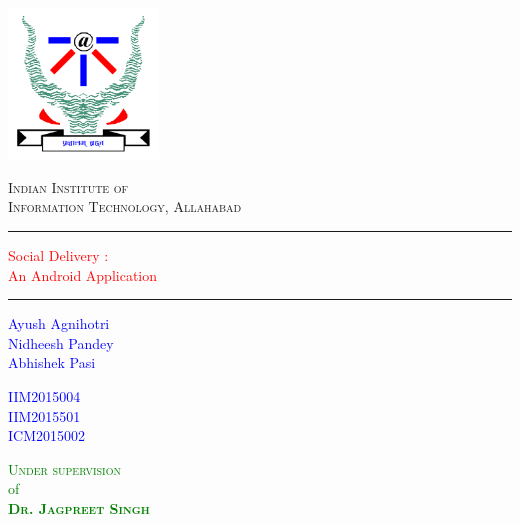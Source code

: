 \documentclass{report}
\begin{document}
 

\begin{titlepage}
	\centering
	\includegraphics[width=4cm]{logo.png}\\[.5cm]
	{\scshape\LARGE Indian Institute of \\Information Technology, Allahabad \par}
	\vspace{1cm}
	\rule{\textwidth}{2pt}	
	\vspace{0.15\textheight}
		
	\textcolor{Red}{ 
		{\fontsize{35}{52}\selectfont Social Delivery : \\[8pt] An Android Application}\\[0.5\baselineskip]
	}
	
	\vspace{0.15\textheight} 
	\setlength\columnsep{0pt}
	\rule{0.3\textwidth}{0.4pt} 
	\begin{multicols}{3} 
	\textcolor{Blue}{
		\begin{flushleft} 
		{\large \quad \quad \quad \quad Ayush Agnihotri}\\[8pt] 
		{\large \quad \quad \quad \quad Nidheesh Pandey}\\[8pt]
		{\large \quad \quad \quad \quad Abhishek Pasi}\\[8pt]
		\end{flushleft}
		}
		\columnbreak
		 
	\textcolor{Blue}{
		\begin{flushleft} 
		{\large IIM2015004}\\[8pt] 
		{\large IIM2015501}\\[8pt]
		{\large ICM2015002}\\[8pt]
		\end{flushleft}
		}
		\columnbreak

	\textcolor{Green}{
		\begin{flushright}
		{\Large \textsc{Under supervision}}\\[8pt]
		{\large of}\\[8pt]
		{\Large \textsc{\textbf{Dr. Jagpreet Singh}}}\\[8pt]
		\end{flushright}
		}
	\end{multicols}
	\vspace{0.015\textheight} 
	

\end{titlepage}
\end{document}
